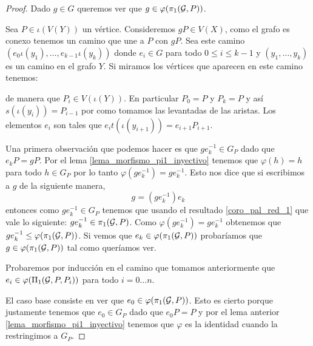 \documentclass[tesis.tex]{subfiles}
\begin{document}
\begin{proof}
	Dado $g \in G$ queremos ver que $g \in \varphi(\pi_1({\cal G}, P))$.
	
	Sea $P \in \iota(V(Y))$ un vértice.
	Consideremos $gP \in V(X)$, como el grafo es conexo tenemos un camino que une a $P$ con $gP$. 
	Sea este camino $(e_{0}\iota(y_{1}), \dots, e_{k-1}\iota(y_{k}))$ donde $e_{i} \in G$ para todo $0 \le i \le k-1$ y $(y_{1}, \dots, y_{k})$ es un camino en el grafo $Y$.
	Si miramos los vértices que aparecen en este camino tenemos:	
	\begin{center}
	\end{center}


	de manera que $P_i \in V(\iota (Y))$.
	En particular $P_0 = P$ y  $P_k = P$ y así $s(\iota (y_i)) = P_{i-1}$ por como tomamos las levantadas de las aristas.
	Los elementos $e_i$ son tales que $e_i t(\iota (y_{i+1})) = e_{i+1}P_{i+1}$.	
	
	
	Una primera observación que podemos hacer es que $g e_k^{-1} \in G_P$ dado que  $e_k P = g P$.
	Por el lema \ref{lema_morfismo_pi1_inyectivo} tenemos que $\varphi(h) = h $ para todo $h \in G_P$ por lo tanto $\varphi(ge_{k}^{-1}) = ge_{k}^{-1}$.
	Esto nos dice que si escribimos a $g$ de la siguiente manera,
	\[
	g = (ge_k^{-1}) e_k
	\]
	entonces como $ge_k^{-1} \in G_P$ tenemos que usando el resultado \ref{coro_pal_red_1} que vale lo siguiente: $ge_k^{-1} \in \pi_1({\cal G},P)$.
	Como $ \varphi(ge_{k}^{-1}) = ge_{k}^{-1}$ obtenemos que  $ge_{k}^{-1} \le \varphi(\pi_1({\cal G}, P))$.  
	Si vemos que $e_k \in \varphi(\pi_1({\cal G}, P))$ probaríamos que $g \in \varphi (\pi_1({\cal G},P))$ tal como queríamos ver.
		
	Probaremos por inducción en el camino que tomamos anteriormente que $e_i \in \varphi(\Pi_1({\cal G}, P, P_i))$ para todo $i = 0 \dots n$.
	
	El caso base consiste en ver que $e_0 \in \varphi(\pi_1({\cal G}, P))$.
	Esto es cierto porque justamente tenemos que $e_0 \in G_P$ dado que $e_{0}P = P$ y por el lema anterior \ref{lema_morfismo_pi1_inyectivo} tenemos que $\varphi$ es la identidad cuando la restringimos a $G_P$.
	

\end{proof}
\end{document}
